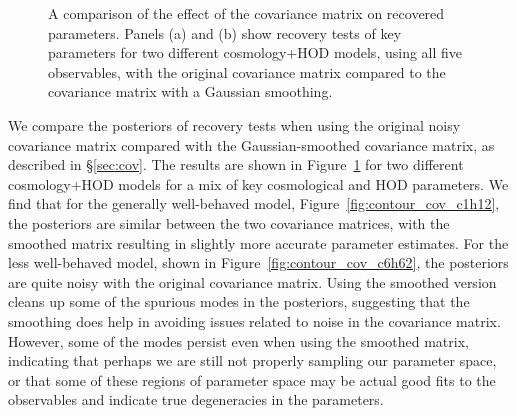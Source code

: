 \begin{figure}[t]
\centering
{}
\hspace{1em}
\caption{A comparison of the effect of the covariance matrix on recovered parameters. Panels (a) and (b) show recovery tests of key parameters for two different cosmology+HOD models, using all five observables, with the original covariance matrix compared to the covariance matrix with a Gaussian smoothing.}
\label{fig:contour_cov}
\end{figure}

We compare the posteriors of recovery tests when using the original noisy covariance matrix compared with the Gaussian-smoothed covariance matrix, as described in \S\ref{sec:cov}.
The results are shown in Figure~\ref{fig:contour_cov} for two different cosmology+HOD models for a mix of key cosmological and HOD parameters.
We find that for the generally well-behaved model, Figure~\ref{fig:contour_cov_c1h12}, the posteriors are similar between the two covariance matrices, with the smoothed matrix resulting in slightly more accurate parameter estimates.
For the less well-behaved model, shown in  Figure~\ref{fig:contour_cov_c6h62}, the posteriors are quite noisy with the original covariance matrix.
Using the smoothed version cleans up some of the spurious modes in the posteriors, suggesting that the smoothing does help in avoiding issues related to noise in the covariance matrix. 
However, some of the modes persist even when using the smoothed matrix, indicating that perhaps we are still not properly sampling our parameter space, or that some of these regions of parameter space may be actual good fits to the observables and indicate true degeneracies in the parameters.


